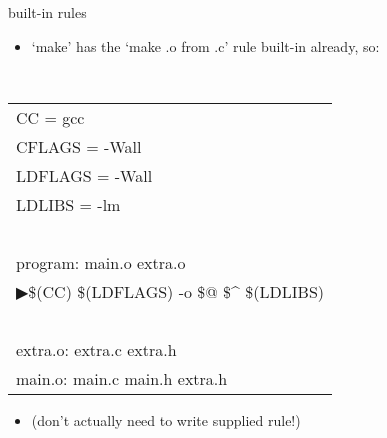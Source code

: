 \begin{frame}{built-in rules}
\begin{itemize}
\item `make' has the `make .o from .c' rule built-in already, so:
\end{itemize}
{\tt
\begin{tabular}{l}
CC = gcc \\
CFLAGS = -Wall \\
LDFLAGS = -Wall \\
LDLIBS = -lm \\
~ \\
program: main.o extra.o \\
▶\hspace{1.5cm}\$(CC) \$(LDFLAGS) -o {\$@} {\$\textasciicircum} \$(LDLIBS) \\
~ \\
extra.o: extra.c extra.h \\
main.o: main.c main.h extra.h \\
\end{tabular}
}
\begin{itemize}
\item (don't actually need to write supplied rule!)
\end{itemize}
\end{frame}


